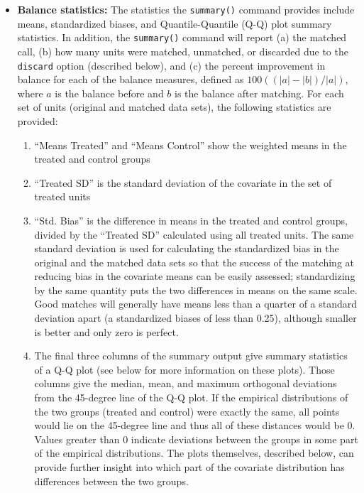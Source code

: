 \begin{itemize}
\item {\bf Balance statistics:} The statistics the \texttt{summary()}
  command provides include means, standardized biases, and
  Quantile-Quantile (Q-Q) plot summary statistics.  In
  addition, the \texttt{summary()} command will report (a) the matched
  call, (b) how many units were matched, unmatched, or discarded due
  to the \texttt{discard} option (described below), and (c) the
  percent improvement in balance for each of the balance measures,
  defined as $100((|a|-|b|)/|a|)$, where $a$ is the balance before and
  $b$ is the balance after matching.  For each set of units (original
  and matched data sets), the following statistics are provided:
\begin{enumerate}
  \item ``Means Treated'' and ``Means Control'' show the weighted
    means in the treated and control groups
  \item ``Treated SD'' is the standard deviation of the covariate in
    the set of treated units
  \item ``Std. Bias'' is the difference in means in the treated and
    control groups, divided by the ``Treated SD'' calculated using all
    treated units.  The same standard deviation is used for
    calculating the standardized bias in the original and the matched
    data sets so that the success of the matching at reducing bias in
    the covariate means can be easily assessed; standardizing by the
    same quantity puts the two differences in means on the same scale.
    Good matches will generally have means less than a quarter of a
    standard deviation apart (a standardized biases of less than
    0.25), although smaller is better and only zero is perfect.
  \item The final three columns of the summary output give summary
    statistics of a Q-Q plot (see below for more information on these
    plots). Those columns give the median, mean, and maximum
    orthogonal deviations from the 45-degree line of the Q-Q plot.  If
    the empirical distributions of the two groups (treated and
    control) were exactly the same, all points would lie on the
    45-degree line and thus all of these distances would be 0.  Values
    greater than 0 indicate deviations between the groups in some part
    of the empirical distributions.  The plots themselves, described
    below, can provide further insight into which part of the
    covariate distribution has differences between the two groups.
\end{enumerate}


\end{itemize}
